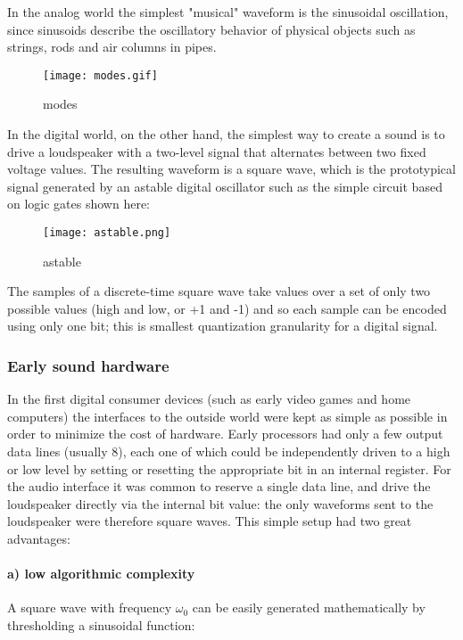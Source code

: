 \documentclass[11pt]{article}
\makeatletter
\def\maxwidth{\ifdim\Gin@nat@width>\linewidth\linewidth
    \else\Gin@nat@width\fi}
\let\Oldincludegraphics\includegraphics
\renewcommand{\includegraphics}[1]{\Oldincludegraphics[width=.8\maxwidth]{#1}}
\makeatother
\begin{document}
In the analog world the simplest "musical" waveform is the sinusoidal
oscillation, since sinusoids describe the oscillatory behavior of
physical objects such as strings, rods and air columns in pipes.

\begin{figure}
\centering
\texttt{[image: modes.gif]}
\caption{modes}
\end{figure}

In the digital world, on the other hand, the simplest way to create a
sound is to drive a loudspeaker with a two-level signal that alternates
between two fixed voltage values. The resulting waveform is a square
wave, which is the prototypical signal generated by an astable digital
oscillator such as the simple circuit based on logic gates shown here:

\begin{figure}
\centering
\texttt{[image: astable.png]}
\caption{astable}
\end{figure}

The samples of a discrete-time square wave take values over a set of
only two possible values (high and low, or +1 and -1) and so each sample
can be encoded using only one bit; this is smallest quantization
granularity for a digital signal.

\subsubsection{Early sound hardware}\label{early-sound-hardware}

In the first digital consumer devices (such as early video games and
home computers) the interfaces to the outside world were kept as simple
as possible in order to minimize the cost of hardware. Early processors
had only a few output data lines (usually 8), each one of which could be
independently driven to a high or low level by setting or resetting the
appropriate bit in an internal register. For the audio interface it was
common to reserve a single data line, and drive the loudspeaker directly
via the internal bit value: the only waveforms sent to the loudspeaker
were therefore square waves. This simple setup had two great advantages:

\paragraph{a) low algorithmic
complexity}\label{a-low-algorithmic-complexity}

A square wave with frequency \(\omega_0\) can be easily generated
mathematically by thresholding a sinusoidal function:
\end{document}

